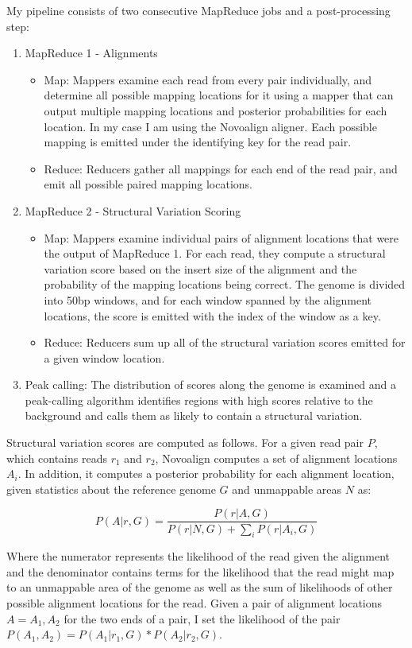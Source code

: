 \documentclass[11pt]{amsart}
\begin{document}
My pipeline consists of two consecutive MapReduce jobs and a post-processing step:

\begin{enumerate}
\item MapReduce 1 - Alignments
\begin{itemize}
\item Map: Mappers examine each read from every pair individually, and determine all possible mapping locations for it using a mapper that can output multiple mapping locations and posterior probabilities for each location. In my case I am using the Novoalign aligner\cite{novo}. Each possible mapping is emitted under the identifying key for the read pair.
\item Reduce: Reducers gather all mappings for each end of the read pair, and emit all possible paired mapping locations.
\end{itemize}
\item MapReduce 2 - Structural Variation Scoring
\begin{itemize}
\item Map: Mappers examine individual pairs of alignment locations that were the output of MapReduce 1. For each read, they compute a structural variation score based on the insert size of the alignment and the probability of the mapping locations being correct. The genome is divided into 50bp windows, and for each window spanned by the alignment locations, the score is emitted with the index of the window as a key.
\item Reduce: Reducers sum up all of the structural variation scores emitted for a given window location.
\end{itemize}
\item Peak calling: The distribution of scores along the genome is examined and a peak-calling algorithm identifies regions with high scores relative to the background and calls them as likely to contain a structural variation.
\end{enumerate}

Structural variation scores are computed as follows. For a given read pair $P$, which contains reads $r_1$ and $r_2$, Novoalign computes a set of alignment locations $A_i$. In addition, it computes a posterior probability for each alignment location, given statistics about the reference genome $G$ and unmappable areas $N$ as:

\[ P(A|r,G) = \frac{P(r|A,G)}{P(r|N,G) + \sum_i{P(r|A_i,G)}} \]

Where the numerator represents the likelihood of the read given the alignment and the denominator contains terms for the likelihood that the read might map to an unmappable area of the genome as well as the sum of likelihoods of other possible alignment locations for the read. Given a pair of alignment locations $A = {A_1, A_2}$ for the two ends of a pair, I set the likelihood of the pair $P(A_1,A_2) = P(A_1|r_1,G) * P(A_2|r_2,G)$. 
\end{document}
